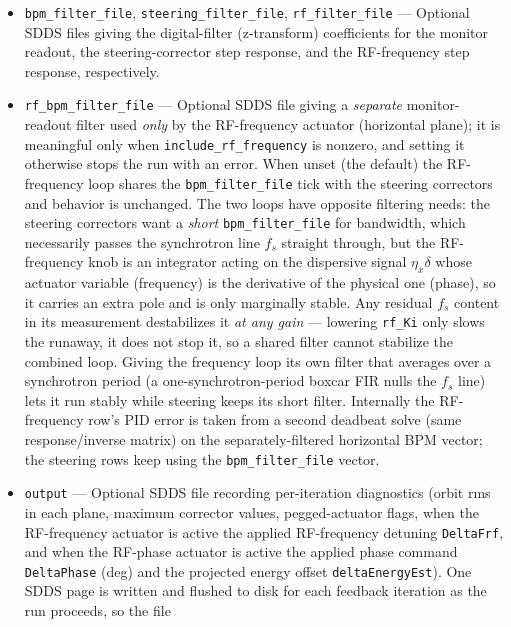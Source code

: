 \documentclass[11pt]{article}
\begin{document}
\begin{itemize}
  rms.  Mutually exclusive with \verb|include_rf_frequency| (which needs exactly the
  $\eta\delta$ signal this removes); declaring both stops the run with an error.
\item \verb|bpm_filter_file|, \verb|steering_filter_file|, \verb|rf_filter_file| ---
  Optional SDDS files giving the digital-filter (z-transform) coefficients for the monitor
  readout, the steering-corrector step response, and the RF-frequency step response,
  respectively.
\item \verb|rf_bpm_filter_file| --- Optional SDDS file giving a \emph{separate} monitor-readout
  filter used \emph{only} by the RF-frequency actuator (horizontal plane); it is meaningful only
  when \verb|include_rf_frequency| is nonzero, and setting it otherwise stops the run with an
  error.  When unset (the default) the RF-frequency loop shares the \verb|bpm_filter_file| tick
  with the steering correctors and behavior is unchanged.  The two loops have opposite filtering
  needs: the steering correctors want a \emph{short} \verb|bpm_filter_file| for bandwidth, which
  necessarily passes the synchrotron line $f_s$ straight through, but the RF-frequency knob is an
  integrator acting on the dispersive signal $\eta_x\delta$ whose actuator variable (frequency)
  is the derivative of the physical one (phase), so it carries an extra pole and is only
  marginally stable.  Any residual $f_s$ content in its measurement destabilizes it \emph{at any
  gain} --- lowering \verb|rf_Ki| only slows the runaway, it does not stop it, so a shared filter
  cannot stabilize the combined loop.  Giving the frequency loop its own filter that averages over
  a synchrotron period (a one-synchrotron-period boxcar FIR nulls the $f_s$ line) lets it run
  stably while steering keeps its short filter.  Internally the RF-frequency row's PID error is
  taken from a second deadbeat solve (same response/inverse matrix) on the separately-filtered
  horizontal BPM vector; the steering rows keep using the \verb|bpm_filter_file| vector.
\item \verb|output| --- Optional SDDS file recording per-iteration diagnostics (orbit rms
  in each plane, maximum corrector values, pegged-actuator flags, when the RF-frequency
  actuator is active the applied RF-frequency detuning \verb|DeltaFrf|, and when the RF-phase
  actuator is active the applied phase command \verb|DeltaPhase| (deg) and the projected
  energy offset \verb|deltaEnergyEst|).  One SDDS page is
  written and flushed to disk for each feedback iteration as the run proceeds, so the file

\end{itemize}
\end{document}

